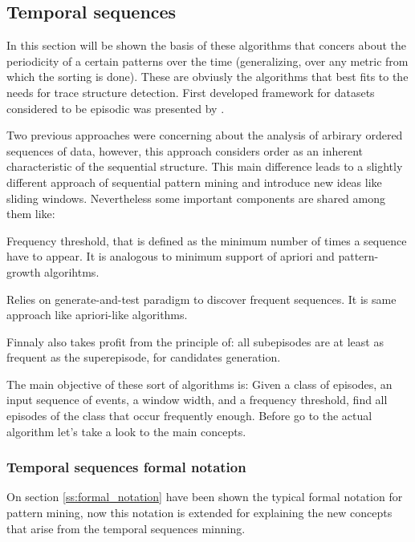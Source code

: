 \subsection{Temporal sequences}\label{ss:temporal_sequences}

In this section will be shown the basis of these algorithms that concers about
the periodicity of a certain patterns over the time (generalizing, over any
metric from which the sorting is done). These are obviusly the
algorithms that best fits to the needs for trace structure detection. First
developed framework for datasets considered to be episodic was presented by
\cite{mannila1995discovering}.

Two previous approaches were concerning about the analysis of arbirary ordered
sequences of data, however, this approach considers order as an inherent
characteristic of the sequential structure. This main difference leads to a
slightly different approach of sequential pattern mining and introduce new ideas 
like sliding windows. Nevertheless some important components are shared among 
them like:
\begin{enumerate*}[label=(\roman*)]
  \item Frequency threshold, that is defined as the minimum number of times a
    sequence have to appear. It is analogous to minimum support of apriori and
    pattern-growth algorihtms.
  \item Relies on generate-and-test paradigm to discover frequent sequences. It
    is same approach like apriori-like algorithms.
  \item Finnaly also takes profit from the principle of: all subepisodes are at
    least as frequent as the superepisode, for candidates generation.
\end{enumerate*}

The main objective of these sort of algorithms is: Given a class of episodes, an
input sequence of events, a window width, and a frequency threshold, find all
episodes of the class that occur frequently enough. Before go to the actual 
algorithm let's take a look to the main concepts.

\subsubsection{Temporal sequences formal notation}

On section \ref{ss:formal_notation} have been shown the typical formal notation
for pattern mining, now this notation is extended for explaining the new
concepts that arise from the temporal sequences minning.

